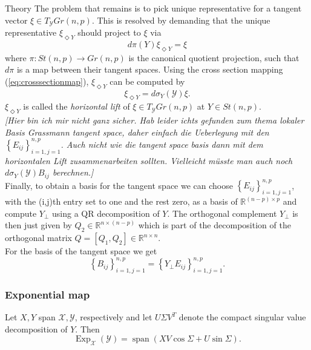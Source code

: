 \begin{chapter}{Theory}
The problem that remains is to pick unique representative for a tangent vector $\xi\in T_{\mathcal{Y}}Gr(n,p)$.
This is resolved by demanding that the unique representative $\xi_{\Diamond Y}$ should project to $\xi$ via
\begin{equation}
d\pi(Y)\xi_{\Diamond Y}=\xi
\end{equation}
where $\pi: St(n,p)\to Gr(n,p)$ is the canonical quotient projection, such that $d\pi$ is a map between their 
tangent spaces. Using the cross section mapping (\ref{eq:crosssectionmap}), $\xi_{\Diamond Y}$ can be computed by
\begin{equation}
\xi_{\Diamond Y} = d\sigma_Y(\mathcal{Y})\xi.
\end{equation}
$\xi_{\Diamond Y}$ is called the \emph{horizontal lift} of $\xi\in T_{\mathcal{Y}}Gr(n,p)$ at $Y\in St(n,p)$.\\

\textit{[Hier bin ich mir nicht ganz sicher. Hab leider ichts gefunden zum thema lokaler
Basis Grassmann tangent space, daher einfach die Ueberlegung mit den $\left\lbrace E_{ij}\right\rbrace_{i=1,j=1}^{n,p}$. Auch nicht wie die tangent space basis dann mit dem horizontalen 
Lift zusammenarbeiten sollten. Vielleicht müsste man auch noch $d\sigma_Y(\mathcal{Y})B_{ij}$
berechnen.] 
}\\

Finally, to obtain a basis for the tangent space we can choose $\left\lbrace E_{ij}\right\rbrace_{i=1,j=1}^{n,p}$, with the (i,j)th entry set to one and the rest zero,
as a basis of $\mathbb{R}^{(n-p)\times p}$ and compute $Y_{\bot}$ using a QR decomposition of $Y$. The orthogonal complement $Y_{\bot}$ is then just given by 
$Q_2\in\mathbb{R}^{n\times (n-p)}$ which is part of the decomposition of the orthogonal matrix $Q=[Q_1,Q_2]\in\mathbb{R}^{n\times n}$.\\
For the basis of the tangent space we get 
\begin{equation}
    \left\lbrace B_{ij}\right\rbrace_{i=1,j=1}^{n,p}=\left\lbrace Y_{\bot}E_{ij}\right\rbrace_{i=1,j=1}^{n,p}.
\end{equation}




\subsubsection{Exponential map} %
\label{ssub:Exponential map}
Let $X, Y$ span $\mathcal{X}, \mathcal{Y}$, respectively and let $U\Sigma V^{T}$ denote the compact singular value decomposition of $Y$. Then
\begin{equation}
    \operatorname{Exp}_{\mathcal{X}}(\mathcal{Y})=\operatorname{span}\left( XV\cos\Sigma + U\sin\Sigma\right).
\end{equation}


\end{chapter}
